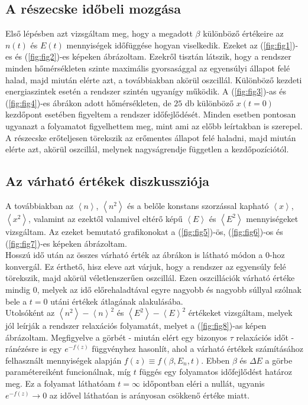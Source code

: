 \subsection*{A részecske időbeli mozgása}
Első lépésben azt vizsgáltam meg, hogy a megadott $\beta$ különböző értékeire az $n \left( t \right)$ és $E \left( t \right)$ mennyiségek időfüggése hogyan viselkedik. Ezeket az (\ref{fig:fig1})-es és (\ref{fig:fig2})-es képeken ábrázoltam. Ezekről tisztán látszik, hogy a rendszer minden hőmérsékleten szinte maximális gyorsasággal az egyensúlyi állapot felé halad, majd miután elérte azt, a továbbiakban akörül oszcillál. Különböző kezdeti energiaszintek esetén a rendszer szintén ugyanígy működik. A (\ref{fig:fig3})-as és (\ref{fig:fig4})-es ábrákon adott hőmérsékleten, de $25$ db különböző $x(t = 0)$ kezdőpont esetében figyeltem a rendszer időfejlődését. Minden esetben pontosan ugyanazt a folyamatot figyelhettem meg, mint ami az előbb leírtakban is szerepel. A részecske erőteljesen törekszik az erőmentes állapot felé haladni, majd miután elérte azt, akörül oszcillál, melynek nagyságrendje független a kezdőpozíciótól.

\subsection*{Az várható értékek diszkussziója}
A továbbiakban az $\left< n \right>$, $\left< n^{2} \right>$ és a belőle konstans szorzással kapható $\left< x \right>$, $\left< x^{2} \right>$, valamint az ezektől valamivel eltérő képű $\left< E \right>$ és $\left< E^{2} \right>$ mennyiségeket vizsgáltam. Az ezeket bemutató grafikonokat a (\ref{fig:fig5})-ös, (\ref{fig:fig6})-os és (\ref{fig:fig7})-es képeken ábrázoltam. \\
Hosszú idő után az összes várható érték az ábrákon is látható módon a $0$-hoz konvergál. Ez érthető, hisz eleve azt várjuk, hogy a rendszer az egyensúly felé törekszik, majd akörül véletlenszerűen oszcillál. Ezen oszcillációk várható értéke mindig $0$, melyek az idő előrehaladtával egyre nagyobb és nagyobb súllyal szólnak bele a $t = 0$ utáni értékek átlagának alakulásába. \\
Utolsóként az $\left< n^{2} \right> - \left< n \right>^{2}$ és $\left< E^{2} \right> - \left< E \right>^{2}$ értékeket vizsgáltam, melyek jól leírják a rendszer relaxációs folyamatát, melyet a (\ref{fig:fig8})-as képen ábrázoltam. Megfigyelve a görbét - miután elért egy bizonyos $\tau$ relaxációs időt - ránézésre is egy $e^{-f \left( z \right)}$ függvényhez hasonlít, ahol a várható értékek számításához felhasznált mennyiségek alapján $f \left( z \right) \equiv f \left( \beta, E_{n}, t \right)$. Ebben $\beta$ és $\Delta E$ a görbe paramétereiként funcionálnak, míg $t$ függés egy folyamatos időfejlődést határoz meg. Ez a folyamat láthatóam $t = \infty$ időpontban eléri a nullát, ugyanis $e^{-f \left( z \right)} \to 0$ az idővel láthatóan is arányosan csökkenő értéke miatt.

